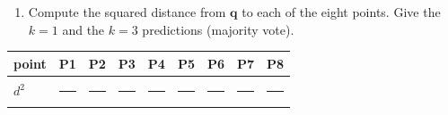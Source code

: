 \documentclass[
  11pt,
]{article}
\newcounter{none} %
\providecommand{\tightlist}{%
  \setlength{\itemsep}{0pt}\setlength{\parskip}{0pt}}
\newcommand{\blank}[1][1.2in]{\rule{#1}{0.4pt}}
\begin{document}
\begin{enumerate}
\def\labelenumi{(\alph{enumi})}
\tightlist
\item
  Compute the squared distance from \(\mathbf{q}\) to each of the eight
  points. Give the \(k = 1\) and the \(k = 3\) predictions (majority
  vote).
\end{enumerate}

{\def\LTcaptype{none} %
\begin{longtable}[]{@{}
  >{\raggedright\arraybackslash}p{}
  >{\raggedright\arraybackslash}p{}
  >{\raggedright\arraybackslash}p{}
  >{\raggedright\arraybackslash}p{}
  >{\raggedright\arraybackslash}p{}
  >{\raggedright\arraybackslash}p{}
  >{\raggedright\arraybackslash}p{}
  >{\raggedright\arraybackslash}p{}
  >{\raggedright\arraybackslash}p{}@{}}
\toprule\noalign{}
\begin{minipage}[b]{\linewidth}\raggedright
point
\end{minipage} & \begin{minipage}[b]{\linewidth}\raggedright
P1
\end{minipage} & \begin{minipage}[b]{\linewidth}\raggedright
P2
\end{minipage} & \begin{minipage}[b]{\linewidth}\raggedright
P3
\end{minipage} & \begin{minipage}[b]{\linewidth}\raggedright
P4
\end{minipage} & \begin{minipage}[b]{\linewidth}\raggedright
P5
\end{minipage} & \begin{minipage}[b]{\linewidth}\raggedright
P6
\end{minipage} & \begin{minipage}[b]{\linewidth}\raggedright
P7
\end{minipage} & \begin{minipage}[b]{\linewidth}\raggedright
P8
\end{minipage} \\
\midrule\noalign{}
\endhead
\bottomrule\noalign{}
\endlastfoot
\(d^2\) & \blank[0.45in] & \blank[0.45in] & \blank[0.45in] &
\blank[0.45in] & \blank[0.45in] & \blank[0.45in] & \blank[0.45in] &
\blank[0.45in] \\
\end{longtable}
}
\end{document}
